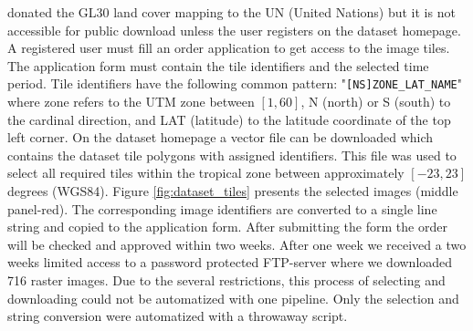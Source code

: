 		\citet{Chen2015} donated the \ac{GL30} land cover mapping to the UN (United Nations) but it is not accessible for public download unless the user registers on the dataset homepage. A registered user must fill an order application to get access to the image tiles. The application form must contain the tile identifiers and the selected time period. Tile identifiers have the following common pattern: "\verb|[NS]ZONE_LAT_NAME|" where zone refers to the \ac{UTM} zone between $[1, 60]$, N (north) or S (south) to the cardinal direction, and LAT (latitude) to the latitude coordinate of the top left corner. On the dataset homepage a vector file can be downloaded which contains the dataset tile polygons with assigned identifiers. This file was used to select all required tiles within the tropical zone between approximately $[-23, 23]$ degrees (\ac{WGS84}). Figure \ref{fig:dataset_tiles} presents the selected images (middle panel-red). The corresponding image identifiers are converted to a single line string and copied to the application form. After submitting the form the order will be checked and approved within two weeks. After one week we received a two weeks limited access to a password protected FTP-server where we downloaded 716 raster images. Due to the several restrictions, this process of selecting and downloading could not be automatized with one pipeline. Only the selection and string conversion were automatized with a throwaway script.
